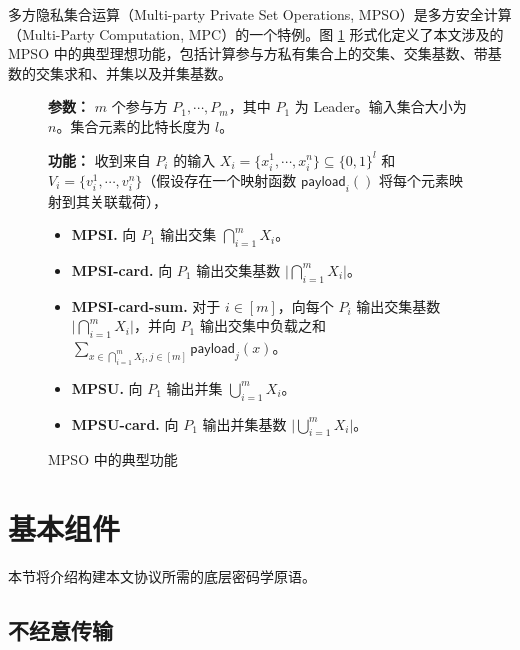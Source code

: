 多方隐私集合运算（Multi-party Private Set Operations, MPSO）是多方安全计算（Multi-Party Computation, MPC）的一个特例。图 \ref{fig:func-mpso} 形式化定义了本文涉及的 MPSO 中的典型理想功能，包括计算参与方私有集合上的交集、交集基数、带基数的交集求和、并集以及并集基数。

\begin{figure}[!htb]
\begin{framed}
\begin{minipage}[center]{\textwidth}
\begin{trivlist}
\item \textbf{参数：} $m$ 个参与方 $P_1, \cdots, P_m$，其中 $P_1$ 为 Leader。输入集合大小为 $n$。集合元素的比特长度为 $l$。
\item \textbf{功能：} 收到来自 $P_i$ 的输入 $X_i = \{x_i^1,\cdots, x_i^n\} \subseteq \{0,1\}^l$ 和 $V_i = \{v_i^1,\cdots, v_i^n\}$（假设存在一个映射函数 $\mathsf{payload}_i()$ 将每个元素映射到其关联载荷），
\begin{itemize}[itemsep=2pt,topsep=0pt,parsep=0pt,leftmargin=10pt]
    \item \textbf{MPSI.} 向 $P_1$ 输出交集 $\bigcap_{i=1}^m X_i$。
    \item \textbf{MPSI-card.} 向 $P_1$ 输出交集基数 $\lvert \bigcap_{i=1}^m X_i \rvert$。
    \item \textbf{MPSI-card-sum.} 对于 $i \in [m]$，向每个 $P_i$ 输出交集基数 $\lvert \bigcap_{i=1}^m X_i \rvert$，并向 $P_1$ 输出交集中负载之和
    $\sum_{x \in \bigcap_{i=1}^m X_i, j \in [m]} \mathsf{payload}_j(x)$。
    \item \textbf{MPSU.} 向 $P_1$ 输出并集 $\bigcup_{i=1}^m X_i$。
    \item \textbf{MPSU-card.} 向 $P_1$ 输出并集基数 $\lvert \bigcup_{i=1}^m X_i \rvert$。
\end{itemize}
\end{trivlist}
\end{minipage}
\end{framed}
\caption{MPSO 中的典型功能}\label{fig:func-mpso}
\end{figure}

\section{基本组件}

本节将介绍构建本文协议所需的底层密码学原语。

\subsection{不经意传输}

